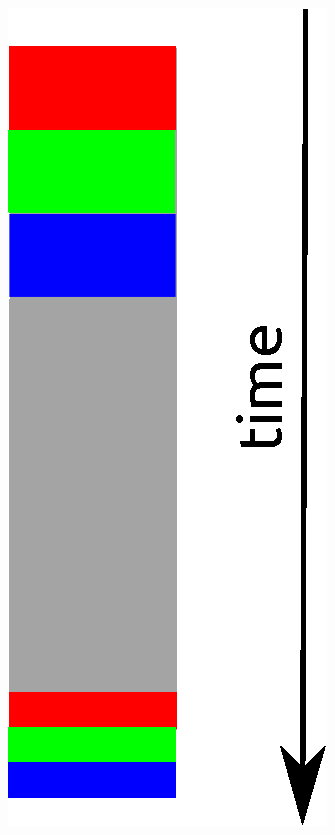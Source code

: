 \documentclass[aspectratio=169]{beamer}
\begin{document}
\begin{frame}
\begin{columns}
    \begin{column}{.2\textwidth}
      \includegraphics[scale=0.45]{img/part1_4_concurrent.eps}
      \vspace{1.7cm}
    \end{column}
  \end{columns}
\end{frame}
\end{document}
